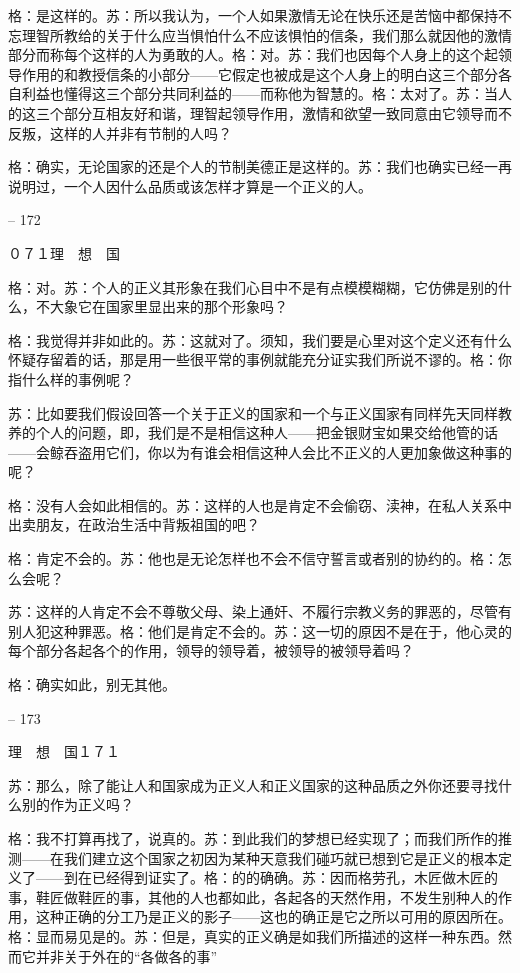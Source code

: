 \documentclass[11pt,oneside]{book}
\begin{document}
\begin{common-format}
    格：是这样的。苏：所以我认为，一个人如果激情无论在快乐还是苦恼中都保持不忘理智所教给的关于什么应当惧怕什么不应该惧怕的信条，我们那么就因他的激情部分而称每个这样的人为勇敢的人。格：对。苏：我们也因每个人身上的这个起领导作用的和教授信条的小部分——它假定也被成是这个人身上的明白这三个部分各自利益也懂得这三个部分共同利益的——而称他为智慧的。格：太对了。苏：当人的这三个部分互相友好和谐，理智起领导作用，激情和欲望一致同意由它领导而不反叛，这样的人并非有节制的人吗？

    格：确实，无论国家的还是个人的节制美德正是这样的。苏：我们也确实已经一再说明过，一个人因什么品质或该怎样才算是一个正义的人。

    

-- 172

    ０７１理　想　国

    格：对。苏：个人的正义其形象在我们心目中不是有点模模糊糊，它仿佛是别的什么，不大象它在国家里显出来的那个形象吗？

    格：我觉得并非如此的。苏：这就对了。须知，我们要是心里对这个定义还有什么怀疑存留着的话，那是用一些很平常的事例就能充分证实我们所说不谬的。格：你指什么样的事例呢？

    苏：比如要我们假设回答一个关于正义的国家和一个与正义国家有同样先天同样教养的个人的问题，即，我们是不是相信这种人——把金银财宝如果交给他管的话——会鲸吞盗用它们，你以为有谁会相信这种人会比不正义的人更加象做这种事的呢？

    格：没有人会如此相信的。苏：这样的人也是肯定不会偷窃、渎神，在私人关系中出卖朋友，在政治生活中背叛祖国的吧？

    格：肯定不会的。苏：他也是无论怎样也不会不信守誓言或者别的协约的。格：怎么会呢？

    苏：这样的人肯定不会不尊敬父母、染上通奸、不履行宗教义务的罪恶的，尽管有别人犯这种罪恶。格：他们是肯定不会的。苏：这一切的原因不是在于，他心灵的每个部分各起各个的作用，领导的领导着，被领导的被领导着吗？

    格：确实如此，别无其他。

    

-- 173

    理　想　国１７１

    苏：那么，除了能让人和国家成为正义人和正义国家的这种品质之外你还要寻找什么别的作为正义吗？

    格：我不打算再找了，说真的。苏：到此我们的梦想已经实现了；而我们所作的推测——在我们建立这个国家之初因为某种天意我们碰巧就已想到它是正义的根本定义了——到在已经得到证实了。格：的的确确。苏：因而格劳孔，木匠做木匠的事，鞋匠做鞋匠的事，其他的人也都如此，各起各的天然作用，不发生别种人的作用，这种正确的分工乃是正义的影子——这也的确正是它之所以可用的原因所在。格：显而易见是的。苏：但是，真实的正义确是如我们所描述的这样一种东西。然而它并非关于外在的“各做各的事”


\end{common-format}
\end{document}
